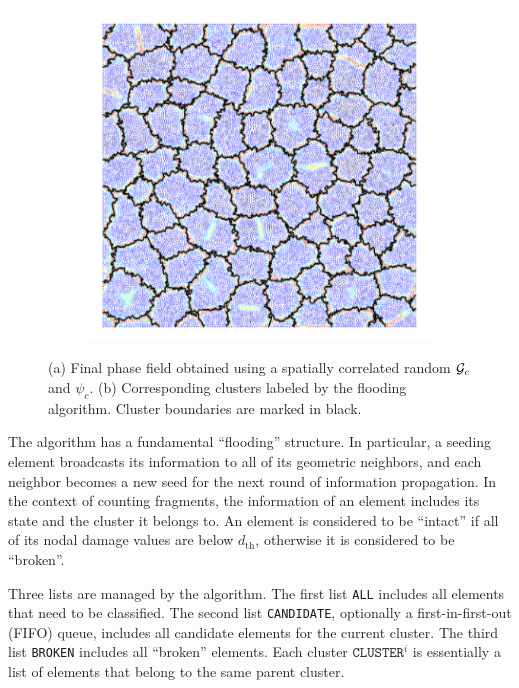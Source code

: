 \begin{figure}[htb!]
\begin{subfigure}[b]{0.36\textwidth}
    \includegraphics[width=\textwidth]{Appendices/figures/cluster.png}
    \vspace{-0.06in}
    \caption{}
  \end{subfigure}
  \caption[A phase field and its corresponding clusters labeled by the flooding algorithm.]{ (a) Final phase field obtained using a spatially correlated random ${\mathcal{G}_c}$ and $\psi_c$. (b) Corresponding clusters labeled by the flooding algorithm. Cluster boundaries are marked in black. }
  \label{fig: clustering}
\end{figure}

The algorithm has a fundamental ``flooding'' structure.  In particular, a seeding element broadcasts its information to all of its geometric neighbors, and each neighbor becomes a new seed for the next round of information propagation. In the context of counting fragments, the information of an element includes its state and the cluster it belongs to. An element is considered to be ``intact'' if all of its nodal damage values are below $d_{\text{th}}$, otherwise it is considered to be ``broken''.

Three lists are managed by the algorithm. The first list \texttt{ALL} includes all elements that need to be classified. The second list \texttt{CANDIDATE}, optionally a first-in-first-out (FIFO) queue, includes all candidate elements for the current cluster. The third list \texttt{BROKEN} includes all ``broken'' elements. Each cluster $\texttt{CLUSTER}^i$ is essentially a list of elements that belong to the same parent cluster.

